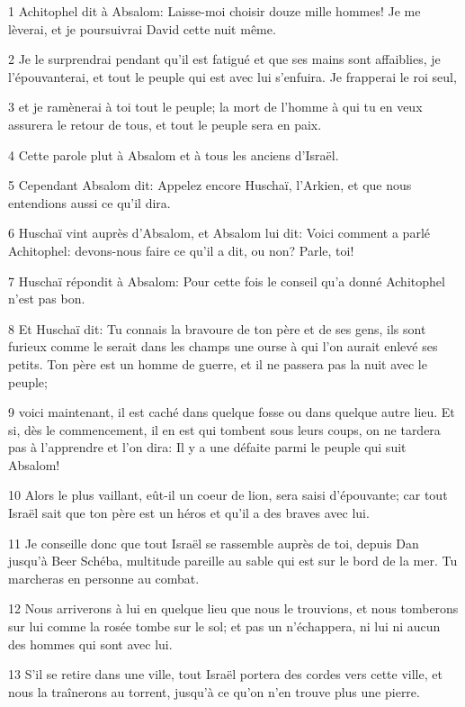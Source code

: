 \par 1 Achitophel dit à Absalom: Laisse-moi choisir douze mille hommes! Je me lèverai, et je poursuivrai David cette nuit même.
\par 2 Je le surprendrai pendant qu'il est fatigué et que ses mains sont affaiblies, je l'épouvanterai, et tout le peuple qui est avec lui s'enfuira. Je frapperai le roi seul,
\par 3 et je ramènerai à toi tout le peuple; la mort de l'homme à qui tu en veux assurera le retour de tous, et tout le peuple sera en paix.
\par 4 Cette parole plut à Absalom et à tous les anciens d'Israël.
\par 5 Cependant Absalom dit: Appelez encore Huschaï, l'Arkien, et que nous entendions aussi ce qu'il dira.
\par 6 Huschaï vint auprès d'Absalom, et Absalom lui dit: Voici comment a parlé Achitophel: devons-nous faire ce qu'il a dit, ou non? Parle, toi!
\par 7 Huschaï répondit à Absalom: Pour cette fois le conseil qu'a donné Achitophel n'est pas bon.
\par 8 Et Huschaï dit: Tu connais la bravoure de ton père et de ses gens, ils sont furieux comme le serait dans les champs une ourse à qui l'on aurait enlevé ses petits. Ton père est un homme de guerre, et il ne passera pas la nuit avec le peuple;
\par 9 voici maintenant, il est caché dans quelque fosse ou dans quelque autre lieu. Et si, dès le commencement, il en est qui tombent sous leurs coups, on ne tardera pas à l'apprendre et l'on dira: Il y a une défaite parmi le peuple qui suit Absalom!
\par 10 Alors le plus vaillant, eût-il un coeur de lion, sera saisi d'épouvante; car tout Israël sait que ton père est un héros et qu'il a des braves avec lui.
\par 11 Je conseille donc que tout Israël se rassemble auprès de toi, depuis Dan jusqu'à Beer Schéba, multitude pareille au sable qui est sur le bord de la mer. Tu marcheras en personne au combat.
\par 12 Nous arriverons à lui en quelque lieu que nous le trouvions, et nous tomberons sur lui comme la rosée tombe sur le sol; et pas un n'échappera, ni lui ni aucun des hommes qui sont avec lui.
\par 13 S'il se retire dans une ville, tout Israël portera des cordes vers cette ville, et nous la traînerons au torrent, jusqu'à ce qu'on n'en trouve plus une pierre.
